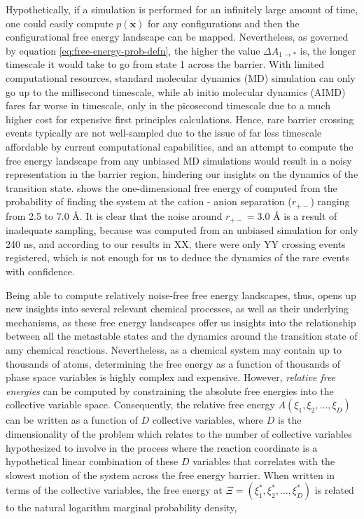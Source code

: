 \begin{spacing}{2.0}
    Hypothetically, if a simulation is performed for an infinitely large amount of time, one could easily compute $p(\mathbf{x})$ for any configurations 
    and then the configurational free energy landscape can be mapped. Nevertheless, as governed by equation \ref{eq:free-energy-prob-defn}, the higher the 
    value $\Delta A_{1\to *}$ is, the longer timescale it would take to go from state 1 across the barrier. With limited computational resources, 
    standard molecular dynamics (MD) simulation can only go up to the millisecond timescale, while ab initio molecular dynamics (AIMD) fares far worse in 
    timescale, only in the picosecond timescale due to a much higher cost for expensive first principles calculations. Hence, rare barrier crossing 
    events typically are not well-sampled due to the issue of far less timescale affordable by current computational capabilities, and an attempt to 
    compute the free energy landscape from any unbiased MD simulations would result in a noisy representation in the barrier region, hindering our 
    insights on the dynamics of the transition state.  shows the one-dimensional free energy of  computed 
    from the probability of finding the system at the cation - anion separation ($r_{+-}$) ranging from 2.5 to 7.0 \r{A}. It is clear that the noise around
    $r_{+-} = 3.0$ \r{A} is a result of inadequate sampling, because  was computed from an unbiased simulation for only 240 ns, and according 
    to our results in XX, there were only YY crossing events registered, which is not enough for us to deduce the dynamics of the rare events with confidence.


    Being able to compute relatively noise-free free energy landscapes, thus, opens up new insights into several relevant chemical processes, as 
    well as their underlying mechanisms, as these free energy landscapes offer us insights into the relationship between all the metastable states 
    and the dynamics around the transition state of amy chemical reactions. Nevertheless, as a chemical system may contain up to thousands of atoms, 
    determining the free energy as a function of thousands of phase space variables is highly complex and expensive. However, \textsl{relative free energies} 
    can be computed by constraining the absolute free energies into the collective variable space. Consequently, the relative free energy 
    $A(\xi_1,\xi_2,\ldots,\xi_D)$ can be written as a function of $D$ collective variables, where $D$ is the dimensionality of the problem which 
    relates to the number of collective variables hypothesized to involve in the process where the reaction coordinate is a hypothetical linear 
    combination of these $D$ variables that correlates with the slowest motion of the system across the free energy barrier. 
    \cite{P-AnnuRevPhysChem-2013-v64-Rohrdanz,P-JCTC-2014-v10-Mullen,P-CurrOpStructBiol-2017-v43-Noe} When written in terms 
    of the collective variables, the free energy at $\Xi = (\xi_1^*,\xi_2^*,\ldots,\xi_D^*)$ is related to the natural logarithm marginal probability density,


\end{spacing}
